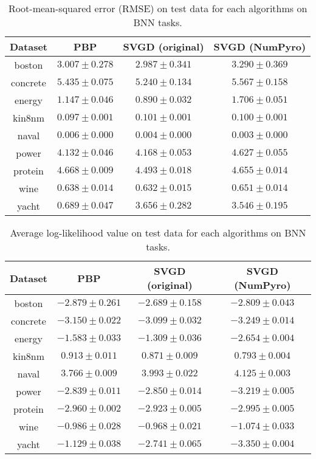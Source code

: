 \begin{table}[]
\centering
\caption{Root-mean-squared error (RMSE) on test data for each algorithms on BNN tasks.} 
\label{tab:bnn_rmse}
\begin{tabular}{|c|ccc|}
\hline
 Dataset & PBP & SVGD (original) & SVGD (NumPyro)  \\
 \hline
boston & $3.007 \pm 0.278$ & $2.987 \pm 0.341$ & $3.290 \pm 0.369$ \\
concrete & $5.435 \pm 0.075$ & $5.240 \pm 0.134$ & $5.567 \pm 0.158$ \\
energy & $1.147 \pm 0.046$ & $0.890 \pm 0.032$ & $1.706 \pm 0.051$ \\
kin8nm & $0.097 \pm 0.001$ & $0.101 \pm 0.001$ & $0.100 \pm 0.001$ \\
naval & $0.006 \pm 0.000$ & $0.004 \pm 0.000$ & $0.003 \pm 0.000$ \\
power & $4.132 \pm 0.046$ & $4.168 \pm 0.053$ & $4.627 \pm 0.055$ \\
protein & $4.668 \pm 0.009$ & $4.493 \pm 0.018$ & $4.655 \pm 0.014$ \\
wine & $0.638 \pm 0.014$ & $0.632 \pm 0.015$ & $0.651 \pm 0.014$ \\
yacht & $0.689 \pm 0.047$ & $3.656 \pm 0.282$ & $3.546 \pm 0.195$ \\
\hline
\end{tabular}
\end{table}

\begin{table}[]
\centering
\caption{Average log-likelihood value on test data for each algorithms on BNN tasks.} 
\label{tab:bnn_logl}
\begin{tabular}{|c|ccc|}
\hline
 Dataset & PBP & SVGD (original) & SVGD (NumPyro)  \\
 \hline
boston & $-2.879 \pm 0.261$ & $-2.689 \pm 0.158$ & $-2.809 \pm 0.043$ \\
concrete & $-3.150 \pm 0.022$ & $-3.099 \pm 0.032$ & $-3.249 \pm 0.014$ \\
energy & $-1.583 \pm 0.033$ & $-1.309 \pm 0.036$ & $-2.654 \pm 0.004$ \\
kin8nm & $0.913 \pm 0.011$ & $0.871 \pm 0.009$ & $0.793 \pm 0.004$ \\
naval & $3.766 \pm 0.009$ & $3.993 \pm 0.022$ & $4.125 \pm 0.003$ \\
power & $-2.839 \pm 0.011$ & $-2.850 \pm 0.014$ & $-3.219 \pm 0.005$ \\
protein & $-2.960 \pm 0.002$ & $-2.923 \pm 0.005$ & $-2.995 \pm 0.005$ \\
wine & $-0.986 \pm 0.028$ & $-0.968 \pm 0.021$ & $-1.074 \pm 0.033$ \\
yacht & $-1.129 \pm 0.038$ & $-2.741 \pm 0.065$ & $-3.350 \pm 0.004$ \\
\hline
\end{tabular}
\end{table}

